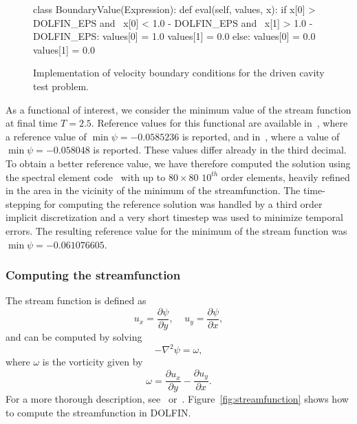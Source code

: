 \begin{figure}[htbp]
  \codesize
  \begin{center}
    \begin{python}
class BoundaryValue(Expression):
    def eval(self, values, x):
        if x[0] > DOLFIN_EPS and \
           x[0] < 1.0 - DOLFIN_EPS and \
           x[1] > 1.0 - DOLFIN_EPS:
            values[0] = 1.0
            values[1] = 0.0
        else:
            values[0] = 0.0
            values[1] = 0.0
    \end{python}
    \caption{Implementation of velocity boundary conditions for the
      driven cavity test problem.}
    \label{fig:bc_drivencavity}
  \end{center}
\end{figure}

As a functional of interest, we consider the minimum value of the
stream function at final time $T = 2.5$. Reference values for this
functional are available in~\cite{transient_dc}, where a reference
value of $\min\psi = -0.0585236$ is reported, and
in~\cite{transient_dc2}, where a value of $\min\psi = -0.058048$ is
reported. These values differ already in the third decimal. To obtain
a better reference value, we have therefore computed the solution
using the spectral element code~\cite{Semtex} with up to $80 \times
80$ $10^{th}$ order elements, heavily refined in the area in the
vicinity of the minimum of the streamfunction. The time-stepping for
computing the reference solution was handled by a third order implicit
discretization and a very short timestep was used to minimize temporal
errors. The resulting reference value for the minimum of the stream
function was $\min\psi =-0.061076605$.

\subsubsection{Computing the streamfunction}

The stream function is defined as
\begin{equation} \nonumber
  u_x = \frac{\partial{\psi}}{\partial{y}}, \;\; \;\;  u_y = \frac{\partial{\psi}}{\partial{x}},
\end{equation}
and can be computed by solving
\begin{equation} \nonumber
  -\nabla^2 \psi = \omega,
 \end{equation}
where $\omega$ is the vorticity given by
\begin{equation} \nonumber
  \omega = \frac{\partial{u_x}}{\partial{y}} - \frac{\partial{u_y}}{\partial{x}}.
\end{equation}
For a more thorough description, see~\cite{white} or~\cite{viscous}.
Figure~\ref{fig:streamfunction} shows how to compute the
streamfunction in DOLFIN.

